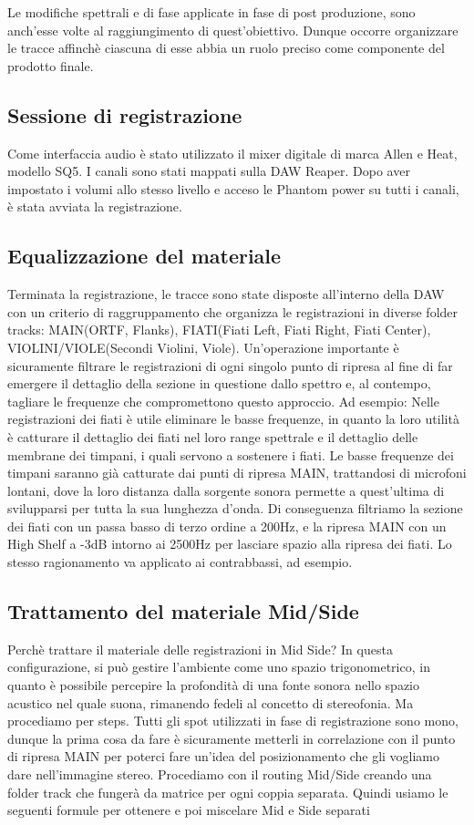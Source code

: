 Le modifiche spettrali e di fase applicate in fase di post produzione, sono anch'esse volte al raggiungimento di quest'obiettivo.
Dunque occorre organizzare le tracce affinchè ciascuna di esse abbia un ruolo preciso come componente del prodotto finale.

\subsection*{Sessione di registrazione}
Come interfaccia audio è stato utilizzato il mixer digitale di marca Allen e Heat, modello SQ5. I canali sono stati mappati sulla DAW Reaper. Dopo aver impostato i volumi allo stesso livello e acceso le Phantom power su tutti i canali, è stata avviata la registrazione.

\subsection*{Equalizzazione del materiale}
Terminata la registrazione, le tracce sono state disposte all'interno della DAW con un criterio di raggruppamento che organizza le registrazioni in diverse folder tracks: MAIN(ORTF, Flanks), FIATI(Fiati Left, Fiati Right, Fiati Center), VIOLINI/VIOLE(Secondi Violini, Viole).
Un'operazione importante è sicuramente filtrare le registrazioni di ogni singolo punto di ripresa al fine di far emergere il dettaglio della sezione in questione dallo spettro e, al contempo, tagliare le frequenze che compromettono questo approccio.
Ad esempio: Nelle registrazioni dei fiati è utile eliminare le basse frequenze, in quanto la loro utilità è catturare il dettaglio dei fiati nel loro range spettrale e il dettaglio delle membrane dei timpani, i quali servono a sostenere i fiati. Le basse frequenze dei timpani saranno già catturate dai punti di ripresa MAIN, trattandosi di microfoni lontani, dove la loro distanza dalla sorgente sonora permette a quest'ultima di svilupparsi per tutta la sua lunghezza d'onda.
Di conseguenza filtriamo la sezione dei fiati con un passa basso di terzo ordine a 200Hz, e la ripresa MAIN con un High Shelf a -3dB intorno ai 2500Hz per lasciare spazio alla ripresa dei fiati.
Lo stesso ragionamento va applicato ai contrabbassi, ad esempio.

\subsection*{Trattamento del materiale Mid/Side}
Perchè trattare il materiale delle registrazioni in Mid Side?
In questa configurazione, si può gestire l'ambiente come uno spazio trigonometrico, in quanto è possibile percepire la profondità di una fonte sonora nello spazio acustico nel quale suona, rimanendo fedeli al concetto di stereofonia.
Ma procediamo per steps.
Tutti gli spot utilizzati in fase di registrazione sono mono, dunque la prima cosa da fare è sicuramente metterli in correlazione con il punto di ripresa MAIN per poterci fare un'idea del posizionamento che  gli vogliamo dare nell'immagine stereo.
Procediamo con il routing Mid/Side creando una folder track che fungerà da matrice per ogni coppia separata. Quindi usiamo le seguenti formule per ottenere e poi miscelare Mid e Side separati

